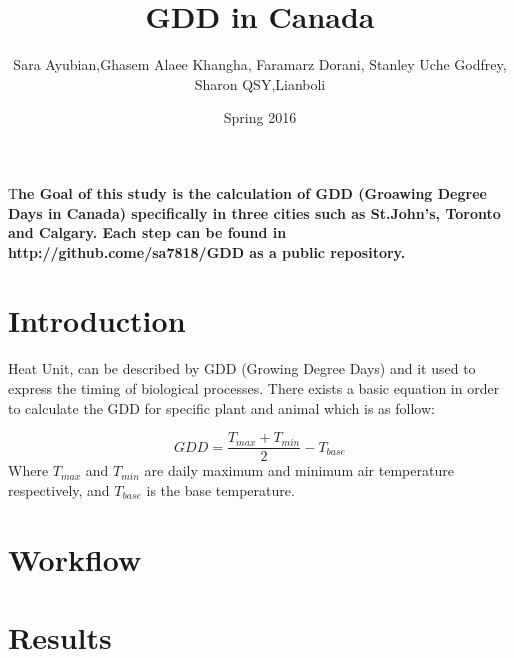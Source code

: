 \documentclass[DIV=calc, paper=a4, fontsize=11pt, twocolumn]{scrartcl}
\title{GDD in Canada}
\author{Sara Ayubian,Ghasem Alaee Khangha, Faramarz Dorani, Stanley Uche Godfrey, Sharon QSY,Lianboli }
\date{Spring 2016} %
\newcommand{\initial}[1]{ 
\lettrine[lines=3,lhang=0.3,nindent=0em]{
\color{DarkGoldenrod}
{\textsf{#1}}}{}}
\begin{document}
\maketitle %

\thispagestyle{fancy} %


\initial{T}\textbf{he Goal of this study is the calculation of GDD (Groawing Degree Days in Canada) specifically in three cities such as St.John's, Toronto and Calgary. Each step can be found in http://github.come/sa7818/GDD as a public repository.}


\section*{Introduction}

Heat Unit, can be described by GDD (Growing Degree Days) and it used to express the timing of biological processes. There exists a basic equation in order to calculate the GDD for specific plant and animal which is as follow:


\begin{equation}
GDD =\frac {T_{max}+T_{min}}{2}-T_{base}
\end{equation}
Where $T_{max}$ and $T_{min}$ are daily maximum and minimum air temperature respectively, and $T_{base}$ is the base temperature.




\section*{Workflow}



\section*{Results}
\end{document}
